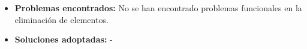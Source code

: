 \begin{itemize}
    \item \textbf{Problemas encontrados:} No se han encontrado problemas
    funcionales en la eliminación de elementos.
    \item \textbf{Soluciones adoptadas:} -
  \end{itemize}
